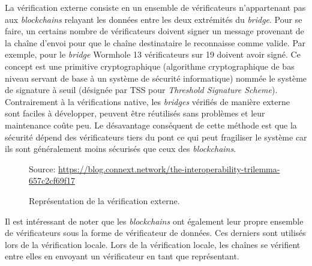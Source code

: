  La vérification externe consiste en un ensemble de vérificateurs n’appartenant pas aux \textit{blockchains} relayant les données entre les deux extrémités du \textit{bridge}. Pour se faire, un certains nombre de vérificateurs doivent signer un message provenant de la chaîne d’envoi pour que le chaîne destinataire le reconnaisse comme valide. Par exemple, pour le \textit{bridge} Wormhole 13 vérificateurs sur 19 doivent avoir signé\cite{NomadDocsExternal}. Ce concept est une primitive cryptographique (algorithme cryptographique de bas niveau servant de base à un système de sécurité informatique) nommée le système de signature à seuil (désignée par TSS pour \textit{Threshold Signature Scheme})\cite{BinanceTSS}. 
Contrairement à la vérifications native, les \textit{bridges} vérifiés de manière externe sont faciles à développer, peuvent être réutilisés sans problèmes et leur maintenance coûte peu. Le désavantage conséquent de cette méthode est que la sécurité dépend des vérificateurs tiers du pont ce qui peut fragiliser le système car ils sont généralement moins sécurisés que ceux des \textit{blockchains}. \\

\begin{figure}[h!]
    \centering

    {\scriptsize
            Source: \url{https://blog.connext.network/the-interoperability-trilemma-657c2cf69f17}}
    \caption{Représentation de la vérification externe.}
    \label{fig:ExternalVerif}
\end{figure}

Il est intéressant de noter que les \textit{blockchains} ont également leur propre ensemble de vérificateurs sous la forme de vérificateur de données. Ces derniers sont utilisés lors de la vérification locale. Lors de la vérification locale, les chaînes se vérifient entre elles en envoyant un vérificateur en tant que représentant.

